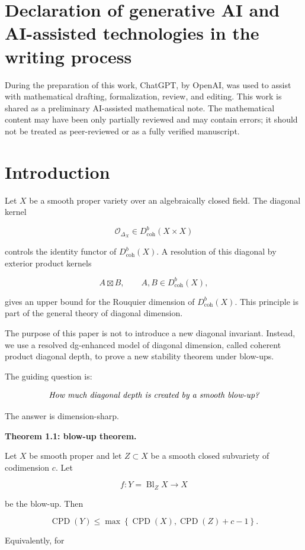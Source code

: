 \documentclass[11pt]{amsart}
\theoremstyle{definition}
\begin{document}
\section*{Declaration of generative AI and AI-assisted technologies in the writing process}
During the preparation of this work, ChatGPT, by OpenAI, was used to assist with mathematical drafting, formalization, review, and editing. This work is shared as a preliminary AI-assisted mathematical note. The mathematical content may have been only partially reviewed and may contain errors; it should not be treated as peer-reviewed or as a fully verified manuscript.

\section{Introduction}

Let $X$ be a smooth proper variety over an algebraically closed field. The diagonal kernel

\[
\mathcal O_{\Delta_X}\in D^b_{\mathrm{coh}}(X\times X)
\]

controls the identity functor of $D^b_{\mathrm{coh}}(X)$. A resolution of this diagonal by exterior product kernels

\[
A\boxtimes B,
\qquad
A,B\in D^b_{\mathrm{coh}}(X),
\]

gives an upper bound for the Rouquier dimension of $D^b_{\mathrm{coh}}(X)$. This principle is part of the general theory of diagonal dimension.

The purpose of this paper is not to introduce a new diagonal invariant. Instead, we use a resolved dg-enhanced model of diagonal dimension, called coherent product diagonal depth, to prove a new stability theorem under blow-ups.

The guiding question is:

\[
\emph{How much diagonal depth is created by a smooth blow-up?}
\]

The answer is dimension-sharp.

\noindent\textbf{Theorem 1.1: blow-up theorem.}

Let $X$ be smooth proper and let $Z\subset X$ be a smooth closed subvariety of codimension $c$. Let

\[
f:Y=\operatorname{Bl}_ZX\to X
\]

be the blow-up. Then

\[
\operatorname{CPD}(Y)
\le
\max\left\{
\operatorname{CPD}(X),
\operatorname{CPD}(Z)+c-1
\right\}.
\]

Equivalently, for
\end{document}
